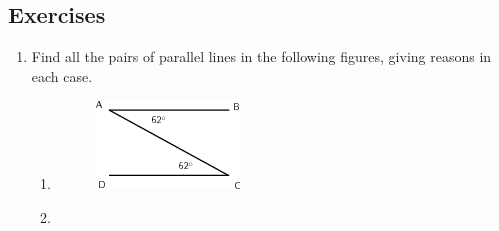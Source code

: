             \subsection{ Exercises}
            \nopagebreak
            \label{m39368*id320135}\begin{enumerate}[noitemsep, label=\textbf{\arabic*}. ] 
            \label{m39368*uid112}\item Find all the pairs of parallel lines in the following figures, giving reasons in each case.

\label{m39368*eip-78}\begin{enumerate}[noitemsep, label=\textbf{\alph*}. ] 
            \label{m39368*uid113}\item 
          
    \setcounter{subfigure}{0}


	\begin{figure}[H] %
    \begin{center}
    \label{m39368*id320164!!!underscore!!!media}\label{m39368*id320164!!!underscore!!!printimage}\includegraphics{col11306.imgs/m39368_MG10C13_054.png} %
        
      \vspace{2pt}
    \vspace{.1in}
    
    \end{center}

 \end{figure}   

    \addtocounter{footnote}{-0}
    
        \label{m39368*uid114}\item 
          
    \setcounter{subfigure}{0}



\end{enumerate}
\end{enumerate}
